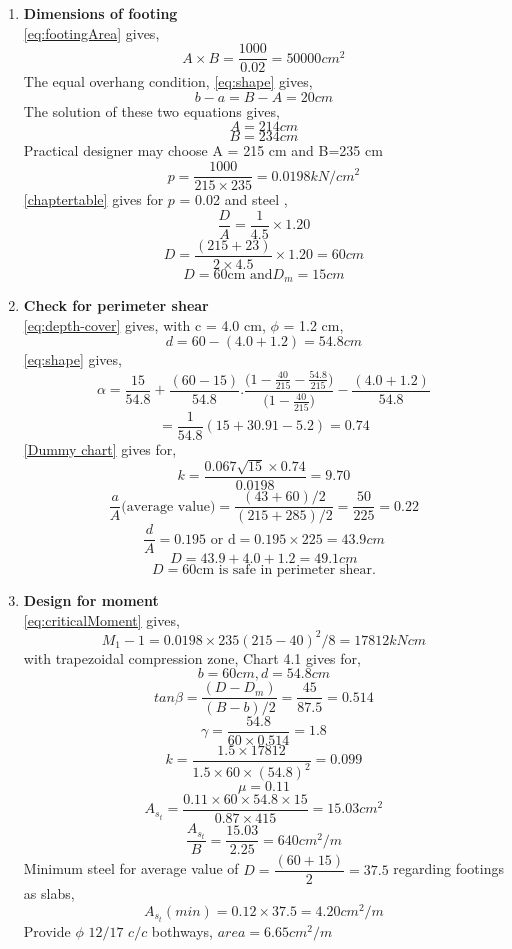 \begin{enumerate}
\item   \textbf{Dimensions of footing}\\
  \equmacro \ref{eq:footingArea} gives,
  $$ A\times B= \frac{1000}{0.02}=50000 cm^2$$
  The equal overhang condition, \equmacro \ref{eq:shape} gives,
  $$ b-a=B-A=20 cm$$
  The solution of these two equations gives,
  $$A=214 cm$$
  $$B=234 cm$$
  Practical designer may choose A = 215 cm and B=235 cm
  $$p=\frac{1000}{215\times235}=0.0198  kN/cm^2$$
  \tablemacro \ref{chaptertable} gives for $p$ = 0.02 and steel \Fefouronefivemacro,
 $$\frac{D}{A}=\frac{1}{4.5}\times1.20$$
 $$D=\frac{(215+23)}{2 \times 4.5} \times 1.20=60cm$$
 $$D=60 \text{cm and} D_m=15cm$$
 
\item  \textbf{Check for perimeter shear}\\
 \equmacro \ref{eq:depth-cover} gives, with c = 4.0 cm, $\phi$ = 1.2 cm,
 $$d=60-(4.0+1.2)=54.8cm$$
 \equmacro \ref{eq:shape} gives,
 $$ \alpha=\frac{15}{54.8}+\frac{(60-15)}{54.8}.\frac{\Bigg(1-\frac{40}{215}-\frac{54.8}{215}\Bigg)}{\Bigg(1-\frac{40}{215}\Bigg)}-\frac{(4.0+1.2)}{54.8}$$
 $$=\frac{1}{54.8}(15+30.91-5.2)=0.74$$
 \chartmacro \ref{Dummy chart} gives for,
 $$ k=\frac{0.067\sqrt{15}\times0.74}{0.0198}=9.70$$
 $$\frac{a}{A} \text{(average value)}=\frac{(43+60)/2}{(215+285)/2}=\frac{50}{225}=0.22$$
 $$\frac{d}{A}=0.195 \text{ or d}=0.195\times225=43.9 cm$$
 $$D=43.9+4.0+1.2=49.1 cm$$
 $$D=60 \text{cm is safe in perimeter shear.}$$
 
\item  \textbf{Design for moment}\\
   \equmacro \ref{eq:criticalMoment} gives,
   $$M_1-1=0.0198 \times 235(215-40)^2/8=17812 kN cm$$
   with trapezoidal compression zone, Chart 4.1 gives for,
   $$b=60cm, d=54.8 cm$$
   $$tan\beta =\frac{(D-D_m)}{(B-b)/2}=\frac{45}{87.5}=0.514$$
   $$\gamma=\frac{54.8}{60\times0.514}=1.8$$
   $$k=\frac{1.5 \times 17812}{1.5 \times 60 \times (54.8)^2}=0.099$$
   $$\mu=0.11$$
   $$A_s_t=\frac{0.11 \times 60 \times 54.8 \times 15}{0.87 \times 415}=15.03cm^2$$
   $$\frac{A_s_t}{B}=\frac{15.03}{2.25}=640 cm^2/m$$
  Minimum steel for average value of $D =\dfrac{(60+15)}{2}=37.5$ regarding footings as slabs,
  $$A_s_t(min)=0.12\times 37.5=4.20 cm^2/m$$
  Provide $\phi$ $12/17$ $c/c$ bothways, $area=6.65 cm^2/m$
  

\end{enumerate}
